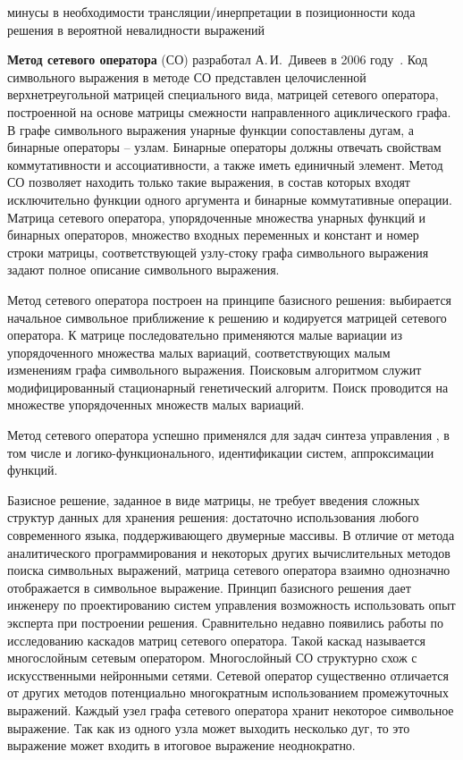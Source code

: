 минусы
в необходимости трансляции/инерпретации
в позиционности кода решения
в вероятной невалидности выражений

\textbf{Метод сетевого оператора} (СО) разработал А.\,И.~Дивеев в 2006 году~\cite{Дивеев2006}.
Код символьного выражения в методе СО представлен целочисленной верхнетреугольной матрицей специального вида, матрицей сетевого оператора, построенной на основе матрицы смежности направленного ациклического графа.
В графе символьного выражения унарные функции сопоставлены дугам, а бинарные операторы -- узлам.
Бинарные операторы должны отвечать свойствам коммутативности и ассоциативности, а также иметь единичный элемент.
Метод СО позволяет находить только такие выражения, в состав которых входят исключительно функции одного аргумента и бинарные коммутативные операции.
Матрица сетевого оператора, упорядоченные множества унарных функций и бинарных операторов, множество входных переменных и констант и номер строки матрицы, соответствующей узлу-стоку графа символьного выражения задают полное описание символьного выражения.

Метод сетевого оператора построен на принципе базисного решения: выбирается начальное символьное приближение к решению и кодируется матрицей сетевого оператора.
К матрице последовательно применяются малые вариации из упорядоченного множества малых вариаций, соответствующих малым изменениям графа символьного выражения.
Поисковым алгоритмом служит модифицированный стационарный генетический алгоритм.
Поиск проводится на множестве упорядоченных множеств малых вариаций.

Метод сетевого оператора успешно применялся для задач синтеза управления , в том числе и логико-функционального, идентификации систем, аппроксимации функций.

Базисное решение, заданное в виде матрицы, не требует введения сложных структур данных для хранения решения: достаточно использования любого современного языка, поддерживающего двумерные массивы.
В отличие от метода аналитического программирования и некоторых других вычислительных методов поиска символьных выражений, матрица сетевого оператора взаимно однозначно отображается в символьное выражение.
Принцип базисного решения дает инженеру по проектированию систем управления возможность использовать опыт эксперта при построении решения.
Сравнительно недавно появились работы по исследованию каскадов матриц сетевого оператора.
Такой каскад называется многослойным сетевым оператором.
Многослойный СО структурно схож с искусственными нейронными сетями.
Сетевой оператор существенно отличается от других методов потенциально многократным использованием промежуточных выражений.
Каждый узел графа сетевого оператора хранит некоторое символьное выражение.
Так как из одного узла может выходить несколько дуг, то это выражение может входить в итоговое выражение неоднократно.

